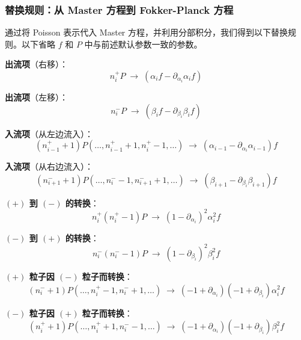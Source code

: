 \subsubsection{替换规则：从 Master 方程到 Fokker-Planck 方程}

通过将 Poisson 表示代入 Master 方程，并利用分部积分，我们得到以下替换规则。以下省略 $f$ 和 $P$ 中与前述默认参数一致的参数。

\begin{derivation}
\textbf{出流项}（右移）：
\begin{equation}\label{eq:replace-out-right}
n_i^+ P \;\to\; (\alpha_i f - \partial_{\alpha_i}\alpha_i f)
\end{equation}

\textbf{出流项}（左移）：
\begin{equation}\label{eq:replace-out-left}
n_i^- P \;\to\; (\beta_i f - \partial_{\beta_i}\beta_i f)
\end{equation}

\textbf{入流项}（从左边流入）：
\begin{equation}\label{eq:replace-in-left}
(n_{i-1}^+ + 1)P(\ldots, n_{i-1}^+ + 1, n_i^+ - 1, \ldots) \;\to\; (\alpha_{i-1} - \partial_{\alpha_i}\alpha_{i-1})f
\end{equation}

\textbf{入流项}（从右边流入）：
\begin{equation}\label{eq:replace-in-right}
(n_{i+1}^- + 1)P(\ldots, n_i^- - 1, n_{i+1}^- + 1, \ldots) \;\to\; (\beta_{i+1} - \partial_{\beta_i}\beta_{i+1})f
\end{equation}
\end{derivation}

\begin{derivation}
\textbf{$(+)$ 到 $(-)$ 的转换}：
\begin{equation}\label{eq:replace-conv-plus}
n_i^+(n_i^+ - 1)P \;\to\; (1 - \partial_{\alpha_i})^2 \alpha_i^2 f
\end{equation}

\textbf{$(-)$ 到 $(+)$ 的转换}：
\begin{equation}\label{eq:replace-conv-minus}
n_i^-(n_i^- - 1)P \;\to\; (1 - \partial_{\beta_i})^2 \beta_i^2 f
\end{equation}

\textbf{$(+)$ 粒子因 $(-)$ 粒子而转换}：
\begin{equation}\label{eq:replace-conv-mix-plus}
(n_i^- + 1)P(\ldots, n_i^+ - 1, n_i^- + 1, \ldots) \;\to\; (-1 + \partial_{\alpha_i})(-1 + \partial_{\beta_i})\alpha_i^2 f
\end{equation}

\textbf{$(-)$ 粒子因 $(+)$ 粒子而转换}：
\begin{equation}\label{eq:replace-conv-mix-minus}
(n_i^+ + 1)P(\ldots, n_i^+ + 1, n_i^- - 1, \ldots) \;\to\; (-1 + \partial_{\alpha_i})(-1 + \partial_{\beta_i})\beta_i^2 f
\end{equation}
\end{derivation}

